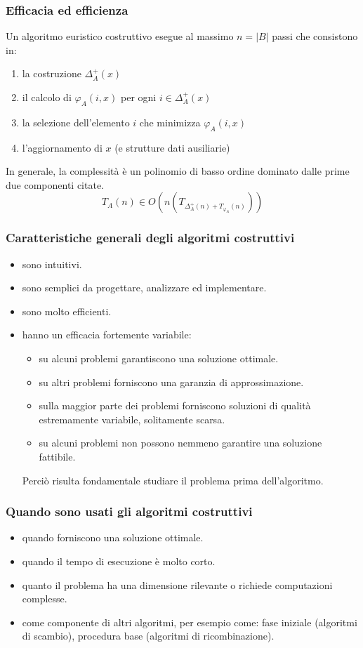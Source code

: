 \documentclass{article}
\begin{document}
\subsubsection{Efficacia ed efficienza}
Un algoritmo euristico costruttivo esegue al massimo $n=|B|$ passi che consistono in:
\begin{enumerate}
    \item la costruzione $\Delta_A^+(x)$
    \item il calcolo di $\varphi_A(i,x)$ per ogni $i\in\Delta_A^+(x)$
    \item la selezione dell'elemento $i$ che minimizza $\varphi_A(i,x)$
    \item l'aggiornamento di $x$ (e strutture dati ausiliarie)
\end{enumerate}
In generale, la complessità è un polinomio di basso ordine dominato dalle prime due componenti citate.
$$T_A(n)\in O\left(n(T_{\Delta_A^+(n)+T_{\varphi_A}(n)})\right)$$

\subsubsection{Caratteristiche generali degli algoritmi costruttivi}
\begin{itemize}
    \item sono intuitivi.
    \item sono semplici da progettare, analizzare ed implementare.
    \item sono molto efficienti.
    \item hanno un efficacia fortemente variabile:
          \begin{itemize}
              \item su alcuni problemi garantiscono una soluzione ottimale.
              \item su altri problemi forniscono una garanzia di approssimazione.
              \item sulla maggior parte dei problemi forniscono soluzioni di qualità estremamente variabile,
                    solitamente scarsa.
              \item su alcuni problemi non possono nemmeno garantire una soluzione fattibile.
          \end{itemize}
          Perciò risulta fondamentale studiare il problema prima dell'algoritmo.
\end{itemize}

\subsubsection{Quando sono usati gli algoritmi costruttivi}
\begin{itemize}
    \item quando forniscono una soluzione ottimale.
    \item quando il tempo di esecuzione è molto corto.
    \item quanto il problema ha una dimensione rilevante o richiede computazioni complesse.
    \item come componente di altri algoritmi, per esempio come: fase iniziale (algoritmi di scambio),
          procedura base (algoritmi di ricombinazione).
\end{itemize}
\end{document}
